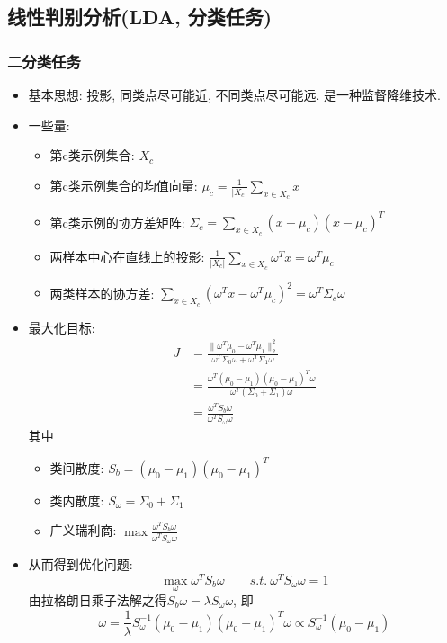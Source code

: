 \documentclass[UTF8]{article}
\begin{document}
\subsection{线性判别分析(LDA, 分类任务)}
\subsubsection{二分类任务}
\begin{itemize}
\item 基本思想: 投影, 同类点尽可能近, 不同类点尽可能远. 是一种监督降维技术.
\item 一些量:
	\begin{itemize}
	\item 第c类示例集合: $X_c$
	\item 第c类示例集合的均值向量: $\mu_c=\frac{1}{|X_c|}\sum_{x\in X_c}x$
	\item 第c类示例的协方差矩阵: $\Sigma_c=\sum_{x\in X_c}(x-\mu_c)(x-\mu_c)^T$
	\item 两样本中心在直线上的投影: $\frac{1}{|X_c|}\sum_{x\in X_c}\omega^Tx=\omega^T\mu_c$
	\item 两类样本的协方差: $\sum_{x\in X_c}(\omega^Tx-\omega^T\mu_c)^2=\omega^T\Sigma_c\omega$
	\end{itemize}
\item 最大化目标:
\begin{align*}
J&=\frac{\|\omega^T\mu_0-\omega^T\mu_1\|_2^2}{\omega^T\Sigma_0\omega+\omega^T\Sigma_1\omega}\\
&=\frac{\omega^T(\mu_0-\mu_1)(\mu_0-\mu_1)^T\omega}{\omega^T(\Sigma_0+\Sigma_1)\omega}\\
&=\frac{\omega^TS_b\omega}{\omega^TS_{\omega} \omega}
\end{align*}
其中
\begin{itemize}
\item 类间散度: $S_b=(\mu_0-\mu_1)(\mu_0-\mu_1)^T$
\item 类内散度: $S_{\omega}=\Sigma_0+\Sigma_1$
\item 广义瑞利商: $\max\frac{\omega^TS_b\omega}{\omega^TS_{\omega} \omega}$
\end{itemize}
\item 从而得到优化问题:
$$\max\limits_{\omega}\omega^TS_b\omega\qquad s.t.\ \omega^TS_{\omega}\omega=1$$
由拉格朗日乘子法解之得$S_b\omega=\lambda S_{\omega}\omega$, 即
$$\omega=\frac{1}{\lambda}S_{\omega}^{-1}(\mu_0-\mu_1)(\mu_0-\mu_1)^T\omega\propto S_{\omega}^{-1}(\mu_0-\mu_1)$$
\end{itemize} 
\end{document}
